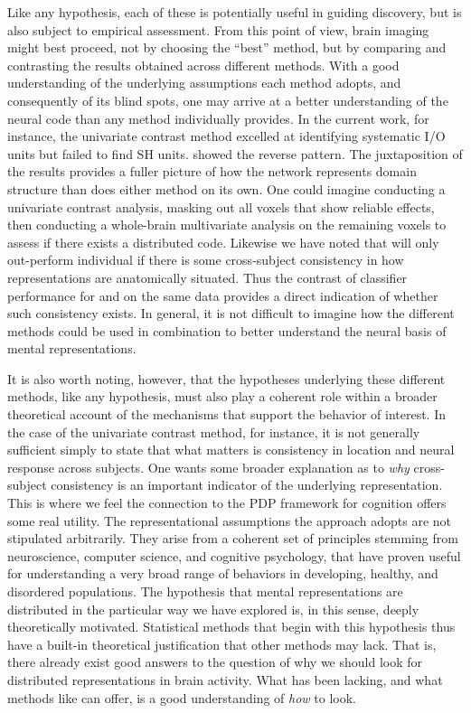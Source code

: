 Like any hypothesis, each of these is potentially useful in guiding discovery, but is also subject to empirical assessment. From this point of view, brain imaging might best proceed, not by choosing the ``best'' method, but by comparing and contrasting the results obtained across different methods. With a good understanding of the underlying assumptions each method adopts, and consequently of its blind spots, one may arrive at a better understanding of the neural code than any method individually provides. In the current work, for instance, the univariate contrast method excelled at identifying systematic I/O units but failed to find SH units. {\soslasso} showed the reverse pattern. The juxtaposition of the results provides a fuller picture of how the network represents domain structure than does either method on its own. One could imagine conducting a univariate contrast analysis, masking out all voxels that show reliable effects, then conducting a whole-brain multivariate analysis on the remaining voxels to assess if there exists a distributed code. Likewise we have noted that {\soslasso} will only out-perform individual {\lasso} if there is some cross-subject consistency in how representations are anatomically situated. Thus the contrast of classifier performance for {\lasso} and {\soslasso} on the same data provides a direct indication of whether such consistency exists. In general, it is not difficult to imagine how the different methods could be used in combination to better understand the neural basis of mental representations.

It is also worth noting, however, that the hypotheses underlying these different methods, like any hypothesis, must also play a coherent role within a broader theoretical account of the mechanisms that support the behavior of interest. In the case of the univariate contrast method, for instance, it is not generally sufficient simply to state that what matters is consistency in location and neural response across subjects. One wants some broader explanation as to {\em why} cross-subject consistency is an important indicator of the underlying representation. This is where we feel the connection to the PDP framework for cognition offers some real utility. The representational assumptions the approach adopts are not stipulated arbitrarily. They arise from a coherent set of principles stemming from neuroscience, computer science, and cognitive psychology, that have proven useful for understanding a very broad range of behaviors in developing, healthy, and disordered populations. The hypothesis that mental representations are distributed in the particular way we have explored is, in this sense, deeply theoretically motivated. Statistical methods that begin with this hypothesis thus have a built-in theoretical justification that other methods may lack. That is, there already exist good answers to the question of why we should look for distributed representations in brain activity. What has been lacking, and what methods like {\soslasso} can offer, is a good understanding of {\em how} to look.